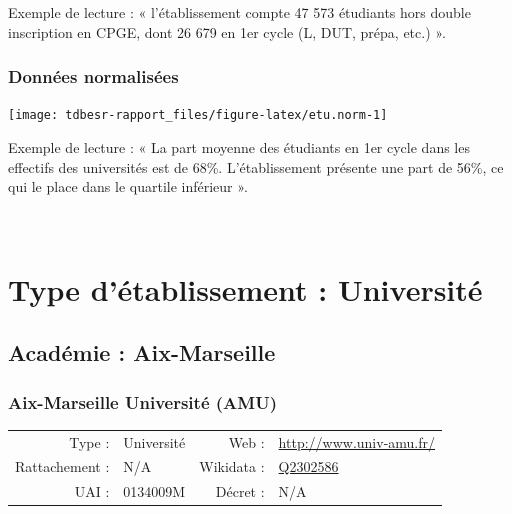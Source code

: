 \documentclass[12pt,french,]{article}
\begin{document}
Exemple de lecture : « l'établissement compte 47 573 étudiants hors
double inscription en CPGE, dont 26 679 en 1er cycle (L, DUT, prépa,
etc.) ».

\hypertarget{donnuxe9es-normalisuxe9es}{%
\subsubsection{Données normalisées}\label{donnuxe9es-normalisuxe9es}}

\begin{center}\texttt{[image: tdbesr-rapport\_files/figure-latex/etu.norm-1]} \end{center}

Exemple de lecture : « La part moyenne des étudiants en 1er cycle dans
les effectifs des universités est de 68\%. L'établissement présente une
part de 56\%, ce qui le place dans le quartile inférieur ».


\newpage
\footnotesize

\checkoddpage

\ifoddpage ~\newpage \fi   

\hypertarget{type-duxe9tablissement-universituxe9}{%
\section{Type d'établissement :
Université}\label{type-duxe9tablissement-universituxe9}}

\hypertarget{acaduxe9mie-aix-marseille}{%
\subsection{Académie : Aix-Marseille}\label{acaduxe9mie-aix-marseille}}

\hypertarget{aix-marseille-universituxe9-amu}{%
\subsubsection{Aix-Marseille Université
(AMU)}\label{aix-marseille-universituxe9-amu}}

\begin{tabular*}{\textwidth}{rp{5cm}rl}  
\hline  
Type : & Université & Web : &\href{http://www.univ-amu.fr/}{http://www.univ-amu.fr/} \\  
Rattachement : & N/A & Wikidata : & \href{https://www.wikidata.org/entity/Q2302586}{Q2302586} \\  
UAI : & 0134009M & Décret : & N/A \\  
\hline  
\end{tabular*}
\end{document}
